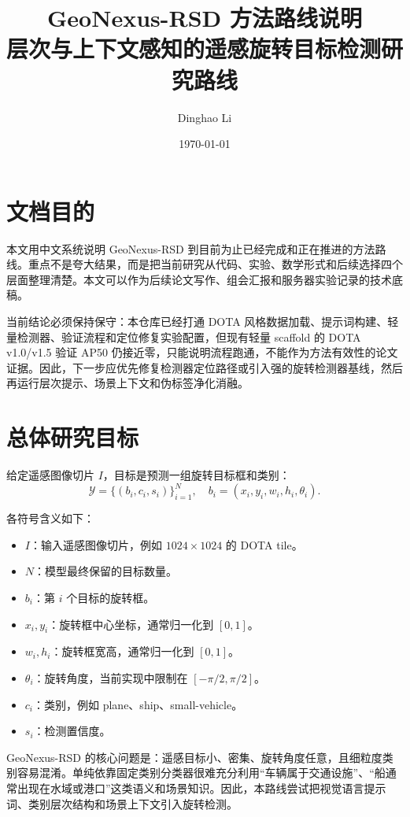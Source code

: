 \documentclass[11pt,a4paper]{ctexart}
\title{\textbf{GeoNexus-RSD 方法路线说明}\\
\large 层次与上下文感知的遥感旋转目标检测研究路线}
\author{Dinghao Li}
\date{\today}
\begin{document}
\maketitle
\tableofcontents
\newpage

\section{文档目的}

本文用中文系统说明 GeoNexus-RSD 到目前为止已经完成和正在推进的方法路线。重点不是夸大结果，而是把当前研究从代码、实验、数学形式和后续选择四个层面整理清楚。本文可以作为后续论文写作、组会汇报和服务器实验记录的技术底稿。

当前结论必须保持保守：本仓库已经打通 DOTA 风格数据加载、提示词构建、轻量检测器、验证流程和定位修复实验配置，但现有轻量 scaffold 的 DOTA v1.0/v1.5 验证 AP50 仍接近零，只能说明流程跑通，不能作为方法有效性的论文证据。因此，下一步应优先修复检测器定位路径或引入强的旋转检测器基线，然后再运行层次提示、场景上下文和伪标签净化消融。

\section{总体研究目标}

给定遥感图像切片 $I$，目标是预测一组旋转目标框和类别：
\[
\mathcal{Y}=\{(b_i,c_i,s_i)\}_{i=1}^{N},
\quad
b_i=(x_i,y_i,w_i,h_i,\theta_i).
\]

各符号含义如下：
\begin{itemize}
  \item $I$：输入遥感图像切片，例如 $1024\times1024$ 的 DOTA tile。
  \item $N$：模型最终保留的目标数量。
  \item $b_i$：第 $i$ 个目标的旋转框。
  \item $x_i,y_i$：旋转框中心坐标，通常归一化到 $[0,1]$。
  \item $w_i,h_i$：旋转框宽高，通常归一化到 $[0,1]$。
  \item $\theta_i$：旋转角度，当前实现中限制在 $[-\pi/2,\pi/2]$。
  \item $c_i$：类别，例如 plane、ship、small-vehicle。
  \item $s_i$：检测置信度。
\end{itemize}

GeoNexus-RSD 的核心问题是：遥感目标小、密集、旋转角度任意，且细粒度类别容易混淆。单纯依靠固定类别分类器很难充分利用``车辆属于交通设施''、``船通常出现在水域或港口''这类语义和场景知识。因此，本路线尝试把视觉语言提示词、类别层次结构和场景上下文引入旋转检测。
\end{document}
